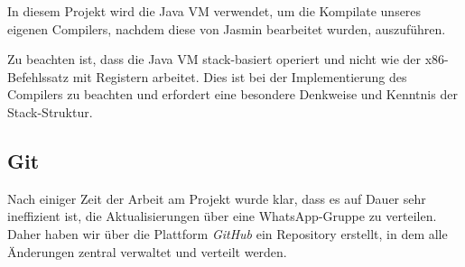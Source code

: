 In diesem Projekt wird die Java VM verwendet, um die Kompilate unseres eigenen Compilers, nachdem diese von Jasmin bearbeitet wurden, auszuführen.

Zu beachten ist, dass die Java VM stack-basiert operiert und nicht wie der x86-Befehlssatz mit Registern arbeitet. Dies ist bei der Implementierung des Compilers zu beachten und erfordert eine besondere Denkweise und Kenntnis der Stack-Struktur.

\subsection{Git}
Nach einiger Zeit der Arbeit am Projekt wurde klar, dass es auf Dauer sehr ineffizient ist, die Aktualisierungen über eine WhatsApp-Gruppe zu verteilen. Daher haben wir über die Plattform \textit{GitHub} ein Repository erstellt, in dem alle Änderungen zentral verwaltet und verteilt werden.